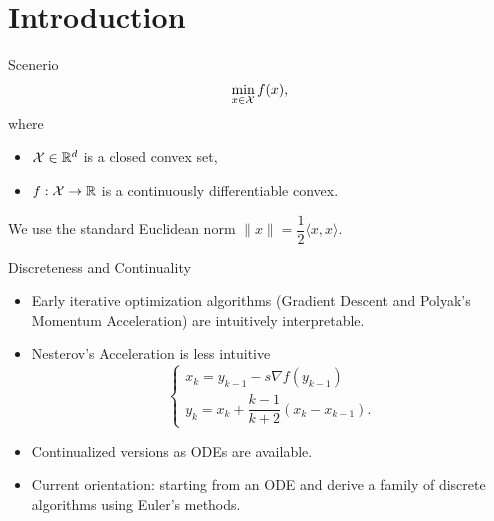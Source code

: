 \section{Introduction}

\begin{frame}{Scenerio}
  \begin{equation}
    \min\limits_{x\in \mathcal{X}} f(x),
  \end{equation}
  where
  \begin{itemize}
    \item $\mathcal{X}\in\mathbb{R}^d$ is a closed convex set,
    \item $f:\mathcal{X}\to\mathbb{R}$ is a continuously differentiable convex.
  \end{itemize}
  We use the standard Euclidean norm $\|x\|= \dfrac{1}{2}\langle x,x\rangle$.
\end{frame}

\begin{frame}{Discreteness and Continuality}
  \begin{itemize}
    \item Early iterative optimization algorithms (Gradient Descent and Polyak's Momentum Acceleration) are intuitively interpretable.
    \item Nesterov's Acceleration is less intuitive
          \begin{equation}
            \begin{cases}
              x_k = y_{k-1} - s\nabla f(y_{k-1}) \\
              y_k = x_k + \dfrac{k-1}{k+2}(x_k - x_{k-1}).
            \end{cases}
          \end{equation}
    \item Continualized versions as ODEs are available.
    \item Current orientation: starting from an ODE and derive a family of discrete algorithms using Euler's methods.
  \end{itemize}
\end{frame}

